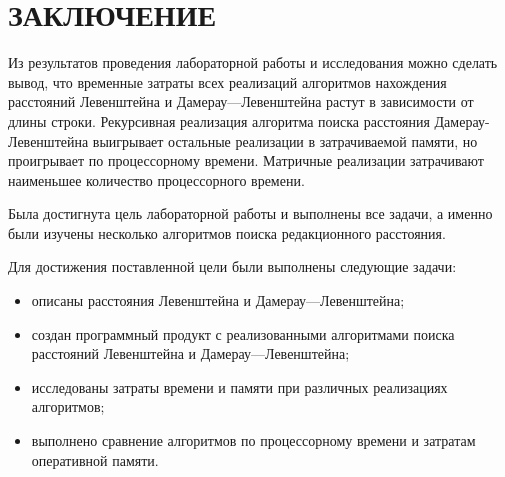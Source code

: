 \chapter*{ЗАКЛЮЧЕНИЕ}

Из результатов проведения лабораторной работы и исследования можно сделать вывод, что временные затраты всех реализаций алгоритмов нахождения расстояний Левенштейна и Дамерау---Левенштейна растут в зависимости от длины строки. 
Рекурсивная реализация алгоритма поиска расстояния Дамерау-Левенштейна выигрывает остальные реализации в затрачиваемой памяти, но проигрывает по процессорному времени. 
Матричные реализации затрачивают наименьшее количество процессорного времени.

Была достигнута цель лабораторной работы и выполнены все задачи, а именно были изучены несколько алгоритмов поиска редакционного расстояния.

Для достижения поставленной цели были выполнены следующие задачи:
\begin{itemize}
	\item описаны расстояния Левенштейна и Дамерау---Левенштейна;
	\item создан программный продукт с реализованными алгоритмами поиска расстояний Левенштейна и Дамерау---Левенштейна;
	\item исследованы затраты времени и памяти при различных реализациях алгоритмов;
	\item выполнено сравнение алгоритмов по процессорному времени и затратам оперативной памяти.
\end{itemize}